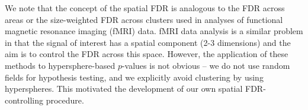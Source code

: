 \documentclass{article}
\begin{document}
We note that the concept of the spatial FDR is analogous to the FDR across areas \cite{pacifico2004false} or the size-weighted FDR across clusters \cite{benjamini2007false} used in analyses of functional magnetic resonance imaging (fMRI) data.
fMRI data analysis is a similar problem in that the signal of interest has a spatial component (2-3 dimensions) and the aim is to control the FDR across this space.
However, the application of these methods to hypersphere-based $p$-values is not obvious -- we do not use random fields for hypothesis testing, and we explicitly avoid clustering by using hyperspheres.
This motivated the development of our own spatial FDR-controlling procedure.

%
%
\end{document}
